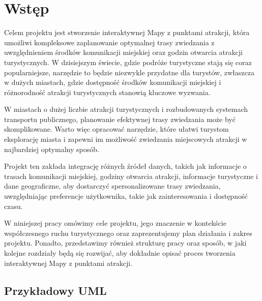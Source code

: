 \documentclass{report}
\begin{document}
	
	
	\clearpage
		\chapter{Wstęp}
	
	Celem projektu jest stworzenie interaktywnej Mapy z punktami atrakcji, która umożliwi kompleksowe zaplanowanie optymalnej trasy zwiedzania z uwzględnieniem środków komunikacji miejskiej oraz godzin otwarcia atrakcji turystycznych. W dzisiejszym świecie, gdzie podróże turystyczne stają się coraz popularniejsze, narzędzie to będzie niezwykle przydatne dla turystów, zwłaszcza w dużych miastach, gdzie dostępność środków komunikacji miejskiej i różnorodność atrakcji turystycznych stanowią kluczowe wyzwania.
	
	W miastach o dużej liczbie atrakcji turystycznych i rozbudowanych systemach transportu publicznego, planowanie efektywnej trasy zwiedzania może być skomplikowane. Warto więc opracować narzędzie, które ułatwi turystom eksplorację miasta i zapewni im możliwość zwiedzania miejscowych atrakcji w najbardziej optymalny sposób.
	
	Projekt ten zakłada integrację różnych źródeł danych, takich jak informacje o trasach komunikacji miejskiej, godziny otwarcia atrakcji, informacje turystyczne i dane geograficzne, aby dostarczyć spersonalizowane trasy zwiedzania, uwzględniając preferencje użytkownika, takie jak zainteresowania i dostępność czasu.
	
	W niniejszej pracy omówimy cele projektu, jego znaczenie w kontekście współczesnego ruchu turystycznego oraz zaprezentujemy plan działania i zakres projektu. Ponadto, przedstawimy również strukturę pracy oraz sposób, w jaki kolejne rozdziały będą się rozwijać, aby dokładnie opisać proces tworzenia interaktywnej Mapy z punktami atrakcji.

	\section{Przykładowy UML}
	\label {sec:przykadowy-uml}
\end{document}
